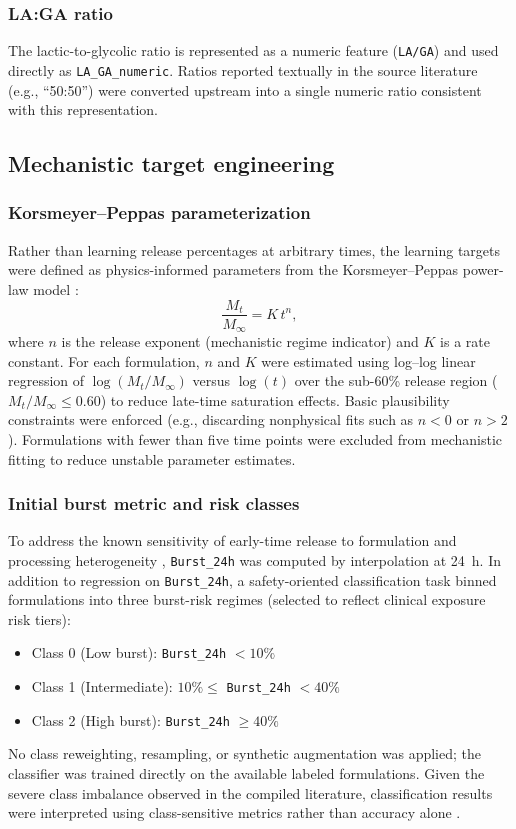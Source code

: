 \documentclass[preprint,12pt,authoryear]{elsarticle}
\begin{document}
\subsubsection{LA:GA ratio}
The lactic-to-glycolic ratio is represented as a numeric feature (\texttt{LA/GA}) and used directly as \texttt{LA\_GA\_numeric}. Ratios reported textually in the source literature (e.g., ``50:50'') were converted upstream into a single numeric ratio consistent with this representation.

\subsection{Mechanistic target engineering}
\label{subsec:targets}
\subsubsection{Korsmeyer--Peppas parameterization}
Rather than learning release percentages at arbitrary times, the learning targets were defined as physics-informed parameters from the Korsmeyer--Peppas power-law model \citep{Korsmeyer1983,RitgerPeppas1987}:
\begin{equation}
\frac{M_t}{M_\infty} = K\, t^n,
\end{equation}
where $n$ is the release exponent (mechanistic regime indicator) and $K$ is a rate constant. For each formulation, $n$ and $K$ were estimated using log--log linear regression of $\log(M_t/M_\infty)$ versus $\log(t)$ over the sub-60\% release region ($M_t/M_\infty \le 0.60$) to reduce late-time saturation effects. Basic plausibility constraints were enforced (e.g., discarding nonphysical fits such as $n<0$ or $n>2$). Formulations with fewer than five time points were excluded from mechanistic fitting to reduce unstable parameter estimates.

\subsubsection{Initial burst metric and risk classes}
To address the known sensitivity of early-time release to formulation and processing heterogeneity \citep{Fredenberg2011,Yoo2020Burst,FreibergZhu2004}, \texttt{Burst\_24h} was computed by interpolation at 24~h. In addition to regression on \texttt{Burst\_24h}, a safety-oriented classification task binned formulations into three burst-risk regimes (selected to reflect clinical exposure risk tiers):
\begin{itemize}
  \item Class 0 (Low burst): \texttt{Burst\_24h} $< 10\%$
  \item Class 1 (Intermediate): $10\% \le$ \texttt{Burst\_24h} $< 40\%$
  \item Class 2 (High burst): \texttt{Burst\_24h} $\ge 40\%$
\end{itemize}
No class reweighting, resampling, or synthetic augmentation was applied; the classifier was trained directly on the available labeled formulations. Given the severe class imbalance observed in the compiled literature, classification results were interpreted using class-sensitive metrics rather than accuracy alone \citep{HeGarcia2009Imbalanced,SokolovaLapalme2009Metrics}.
\end{document}
